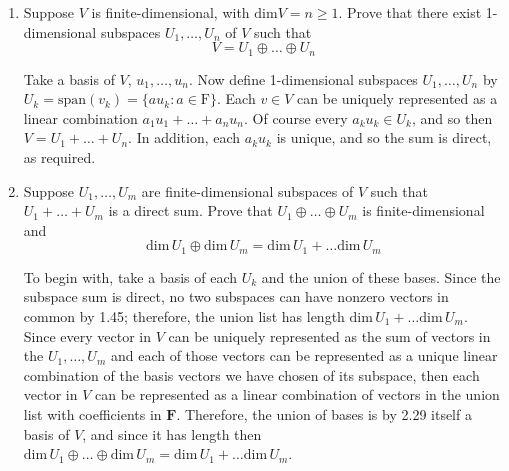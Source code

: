 \documentclass{book}
\begin{document}
\begin{enumerate}
\item Suppose \(V\) is finite-dimensional, with \(\textrm{dim}V=n \geq 1\).  Prove that there exist 1-dimensional subspaces \(U_1,\dots,U_n\) of \(V\) such that \[V=U_1 \oplus \dots \oplus U_n\]

Take a basis of \(V\), \(u_1,\dots,u_n\).  Now define 1-dimensional subspaces \(U_1,\dots,U_n\) by \(U_k=\textrm{span}(v_k)=\{au_k:a \in \textrm{F}\}\).  Each \(v \in V\) can be uniquely represented as a linear combination \(a_1u_1+\dots+a_nu_n\).  Of course every \(a_ku_k \in U_k\), and so then \(V=U_1+\dots+U_n\).  In addition, each \(a_ku_k\) is unique, and so the sum is direct, as required.

\item Suppose \(U_1,\dots,U_m\) are finite-dimensional subspaces of \(V\) such that \(U_1 + \dots + U_m\) is a direct sum.  Prove that \(U_1 \oplus \dots \oplus U_m\) is finite-dimensional and \[\textrm{dim} \, U_1 \oplus \textrm{dim} \, U_m = \textrm{dim} \, U_1 + \dots \textrm{dim} \, U_m\]

To begin with, take a basis of each \(U_k\) and the union of these bases.  Since the subspace sum is direct, no two subspaces can have nonzero vectors in common by 1.45; therefore, the union list has length \(\textrm{dim} \, U_1 + \dots \textrm{dim} \, U_m\).  Since every vector in \(V\) can be uniquely represented as the sum of vectors in the \(U_1,\dots,U_m\) and each of those vectors can be represented as a unique linear combination of the basis vectors we have chosen of its subspace, then each vector in \(V\) can be represented as a linear combination of vectors in the union list with coefficients in \(\textbf{F}\).  Therefore, the union of bases is by 2.29 itself a basis of \(V\), and since it has length then \(\textrm{dim} \, U_1 \oplus \dots \oplus \textrm{dim} \, U_m = \textrm{dim} \, U_1 + \dots \textrm{dim} \, U_m\).


\end{enumerate}
\end{document}
